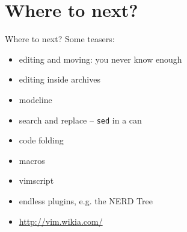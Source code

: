 \documentclass{beamer}
\begin{document}
\section{Where to next?}
\begin{frame}{Where to next?}
  Some teasers:
  \begin{itemize}
    \item editing and moving: you never know enough
    \item editing inside archives
    \item modeline
    \item search and replace -- \texttt{sed} in a can
    \item code folding
    \item macros
    \item vimscript
    \item endless plugins, e.g. the NERD Tree
    \item \url{http://vim.wikia.com/}
  \end{itemize}
\end{frame}
\end{document}
